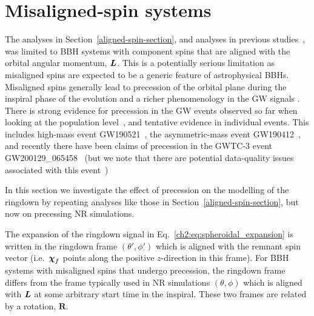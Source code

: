 \section{Misaligned-spin systems}\label{misaligned-spin-section}

The analyses in Section~\ref{aligned-spin-section}, and analyses in previous studies~\cite{Dorband:2006gg, Buonanno:2006ui, Berti:2007fi, Kamaretsos:2011um, Kamaretsos:2012bs, London:2014cma, Baibhav:2017jhs, Giesler:2019uxc, Bhagwat:2019dtm, Ota:2019bzl, JimenezForteza:2020cve, Cook:2020otn, Dhani:2020nik, Mourier:2020mwa, Forteza:2021wfq, MaganaZertuche:2021syq},
was limited to BBH systems with component spins that are aligned with the orbital angular momentum, $\vb*{L}$.
This is a potentially serious limitation as misaligned spins are expected to be a generic feature of astrophysical BBHs.
Misaligned spins generally lead to precession of the orbital plane during the inspiral phase of the evolution and a richer phenomenology in the GW signals \cite{Apostolatos:1994mx}.
There is strong evidence for precession in the GW events observed so far when looking at the population level~\cite{LIGOScientific:2020kqk, LIGOScientific:2021psn}, and tentative evidence in individual events. 
This includes high-mass event GW190521~\cite{LIGOScientific:2020iuh, LIGOScientific:2020ufj}, the asymmetric-mass event GW190412~\cite{LIGOScientific:2020stg}, and recently there have been claims of precession in the GWTC-3 event GW200129\_065458~\cite{Hannam:2021pit} (but we note that there are potential data-quality issues associated with this event~\cite{Payne:2022spz})

In this section we investigate the effect of precession on the modelling of the ringdown by repeating analyses like those in Section~\ref{aligned-spin-section}, but now on precessing NR simulations.

The expansion of the ringdown signal in Eq.~\ref{ch2:eq:spheroidal_expansion} is written in the ringdown frame $(\theta', \phi')$ which is aligned with the remnant spin vector (i.e.\ $\vb*{\chi}_f$ points along the positive $z$-direction in this frame). For BBH systems with misaligned spins that undergo precession, the ringdown frame differs from the frame typically used in NR simulations $(\theta, \phi)$ which is aligned with $\vb*{L}$ at some arbitrary start time in the inspiral.
These two frames are related by a rotation, $\mathbf{R}$.

